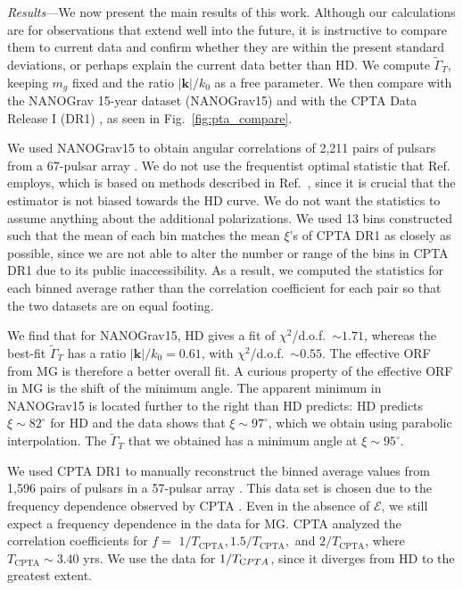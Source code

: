 \documentclass[10pt,prd,twocolumn,aps,nofootinbib,nobibnotes,superscriptaddress,preprintnumbers]{revtex4-2}
\begin{document}
\textit{Results}---We now present the main results of this work. Although our calculations are for observations that extend well into the future, it is instructive to compare them to current data and confirm whether they are within the present standard deviations, or perhaps explain the current data better than HD. We compute $\tilde{\Gamma}_T$, keeping $m_g$ fixed and the ratio $|\boldsymbol{k}|/k_0$ as a free parameter. We then compare with the NANOGrav 15-year dataset (NANOGrav15) \cite{Agazie:2023} and with the CPTA Data Release I (DR1) \cite{Xu:2023wog}, as seen in Fig.~\ref{fig:pta_compare}.

We used NANOGrav15 to obtain angular correlations of 2,211 pairs of pulsars from a 67-pulsar array \cite{Agazie:2023}. We do not use the frequentist optimal statistic that Ref.~\cite{Agazie:2023} employs, which is based on methods described in Ref.~\cite{Allen:2022ksj}, since it is crucial that the estimator is not biased towards the HD curve. We do not want the statistics to assume anything about the additional polarizations. We used 13 bins constructed such that the mean of each bin matches the mean $\xi$'s of CPTA DR1 as closely as possible, since we are not able to alter the number or range of the bins in CPTA DR1 due to its public inaccessibility. As a result, we computed the statistics for each binned average rather than the correlation coefficient for each pair so that the two datasets are on equal footing. 

We find that for NANOGrav15, HD gives a fit of $\chi^2$/d.o.f.\ $\sim 1.71$, whereas the best-fit $\tilde{\Gamma}_T$ has a ratio $|\boldsymbol{k}|/k_0 = 0.61$, with $\chi^2$/d.o.f.\ $\sim 0.55$. The effective ORF from MG is therefore a better overall fit. A curious property of the effective ORF in MG is the shift of the minimum angle. The apparent minimum in NANOGrav15 is located further to the right than HD predicts: HD predicts $\xi \sim 82^\circ$ for HD and the data shows that $\xi \sim 97^\circ$, which we obtain using parabolic interpolation. The $\tilde{\Gamma}_T$ that we obtained has a minimum angle at $\xi \sim 95^\circ$.

We used CPTA DR1 to manually reconstruct the binned average values from 1,596 pairs of pulsars in a 57-pulsar array \cite{Xu:2023wog}. This data set is chosen due to the frequency dependence observed by CPTA \cite{Xu:2023wog}. Even in the absence of $\mathcal{E}$, we still expect a frequency dependence in the data for MG. CPTA analyzed the correlation coefficients for $f=$ $1/T_{\text{CPTA}}, 1.5/T_{\text{CPTA}},$ and $2/T_{\text{CPTA}}$, where $T_{\text{CPTA}} \sim 3.40$ yrs. We use the data for $1/T_{\text CPTA}$, since it diverges from HD to the greatest extent. 
\end{document}
